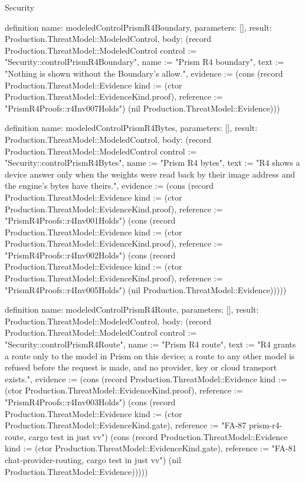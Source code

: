 \begin{lexlean}{Security}
\begin{semanticmodule}
definition{
  name: modeledControlPrismR4Boundary,
  parameters: [],
  result: Production.ThreatModel::ModeledControl,
  body: (record Production.ThreatModel::ModeledControl {control := "Security::controlPrismR4Boundary", name := "Prism R4 boundary", text := "Nothing is shown without the Boundary's allow.", evidence := (cons (record Production.ThreatModel::Evidence {kind := (ctor Production.ThreatModel::EvidenceKind.proof), reference := "PrismR4Proofs::r4Inv007Holds"}) (nil Production.ThreatModel::Evidence))})
}

definition{
  name: modeledControlPrismR4Bytes,
  parameters: [],
  result: Production.ThreatModel::ModeledControl,
  body: (record Production.ThreatModel::ModeledControl {control := "Security::controlPrismR4Bytes", name := "Prism R4 bytes", text := "R4 shows a device answer only when the weights were read back by their image address and the engine's bytes have theirs.", evidence := (cons (record Production.ThreatModel::Evidence {kind := (ctor Production.ThreatModel::EvidenceKind.proof), reference := "PrismR4Proofs::r4Inv001Holds"}) (cons (record Production.ThreatModel::Evidence {kind := (ctor Production.ThreatModel::EvidenceKind.proof), reference := "PrismR4Proofs::r4Inv002Holds"}) (cons (record Production.ThreatModel::Evidence {kind := (ctor Production.ThreatModel::EvidenceKind.proof), reference := "PrismR4Proofs::r4Inv005Holds"}) (nil Production.ThreatModel::Evidence))))})
}

definition{
  name: modeledControlPrismR4Route,
  parameters: [],
  result: Production.ThreatModel::ModeledControl,
  body: (record Production.ThreatModel::ModeledControl {control := "Security::controlPrismR4Route", name := "Prism R4 route", text := "R4 grants a route only to the model in Prism on this device; a route to any other model is refused before the request is made, and no provider, key or cloud transport exists.", evidence := (cons (record Production.ThreatModel::Evidence {kind := (ctor Production.ThreatModel::EvidenceKind.proof), reference := "PrismR4Proofs::r4Inv003Holds"}) (cons (record Production.ThreatModel::Evidence {kind := (ctor Production.ThreatModel::EvidenceKind.gate), reference := "FA-87 prism-r4-route, cargo test in just vv"}) (cons (record Production.ThreatModel::Evidence {kind := (ctor Production.ThreatModel::EvidenceKind.gate), reference := "FA-81 chat-provider-routing, cargo test in just vv"}) (nil Production.ThreatModel::Evidence))))})
}


\end{semanticmodule}
\end{lexlean}
